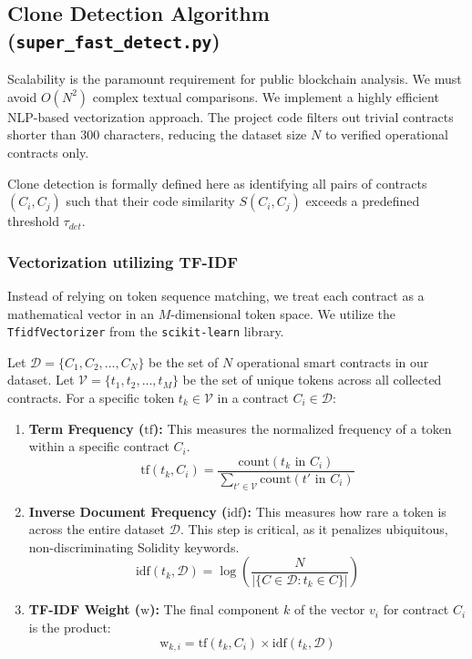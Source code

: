 \documentclass[12pt,a4paper]{article}
\begin{document}
\subsection{Clone Detection Algorithm (\texttt{super\_fast\_detect.py})}
Scalability is the paramount requirement for public blockchain analysis. We must avoid $O(N^2)$ complex textual comparisons. We implement a highly efficient NLP-based vectorization approach. The project code filters out trivial contracts shorter than 300 characters, reducing the dataset size $N$ to verified operational contracts only.

Clone detection is formally defined here as identifying all pairs of contracts $(C_i, C_j)$ such that their code similarity $S(C_i, C_j)$ exceeds a predefined threshold $\tau_{det}$.

\subsubsection{Vectorization utilizing TF-IDF}
Instead of relying on token sequence matching, we treat each contract as a mathematical vector in an $M$-dimensional token space. We utilize the \texttt{TfidfVectorizer} from the \texttt{scikit-learn} library. 

Let $\mathcal{D} = \{C_1, C_2, \dots, C_N\}$ be the set of $N$ operational smart contracts in our dataset. Let $\mathcal{V} = \{t_1, t_2, \dots, t_M\}$ be the set of unique tokens across all collected contracts. For a specific token $t_k \in \mathcal{V}$ in a contract $C_i \in \mathcal{D}$:

\begin{enumerate}
    \item \textbf{Term Frequency ($\text{tf}$):} This measures the normalized frequency of a token within a specific contract $C_i$.
    $$ \text{tf}(t_k, C_i) = \frac{\text{count}(t_k \text{ in } C_i)}{\sum_{t' \in \mathcal{V}} \text{count}(t' \text{ in } C_i)} $$
    
    \item \textbf{Inverse Document Frequency ($\text{idf}$):} This measures how rare a token is across the entire dataset $\mathcal{D}$. This step is critical, as it penalizes ubiquitous, non-discriminating Solidity keywords.
    $$ \text{idf}(t_k, \mathcal{D}) = \log\left(\frac{N}{|\{C \in \mathcal{D} : t_k \in C\}|}\right) $$
    
    \item \textbf{TF-IDF Weight ($\text{w}$):} The final component $k$ of the vector $v_i$ for contract $C_i$ is the product:
    $$ \text{w}_{k,i} = \text{tf}(t_k, C_i) \times \text{idf}(t_k, \mathcal{D}) $$
\end{enumerate}
\end{document}
